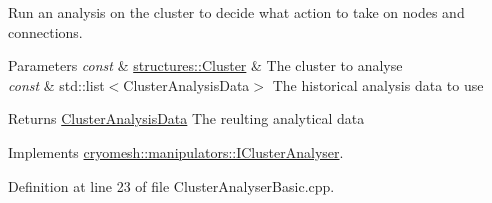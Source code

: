 \-Run an analysis on the cluster to decide what action to take on nodes and connections. 


\begin{DoxyParams}{\-Parameters}
{\em const} & \hyperlink{classcryomesh_1_1structures_1_1Cluster}{structures\-::\-Cluster} \& \-The cluster to analyse \\
\hline
{\em const} & std\-::list$<$\-Cluster\-Analysis\-Data$>$ \-The historical analysis data to use\\
\hline
\end{DoxyParams}
\begin{DoxyReturn}{\-Returns}
\hyperlink{classcryomesh_1_1manipulators_1_1ClusterAnalysisData}{\-Cluster\-Analysis\-Data} \-The reulting analytical data 
\end{DoxyReturn}


\-Implements \hyperlink{classcryomesh_1_1manipulators_1_1IClusterAnalyser_a0b8594c4b41ed14d5a94d191d1ab11fd}{cryomesh\-::manipulators\-::\-I\-Cluster\-Analyser}.



\-Definition at line 23 of file \-Cluster\-Analyser\-Basic.\-cpp.



